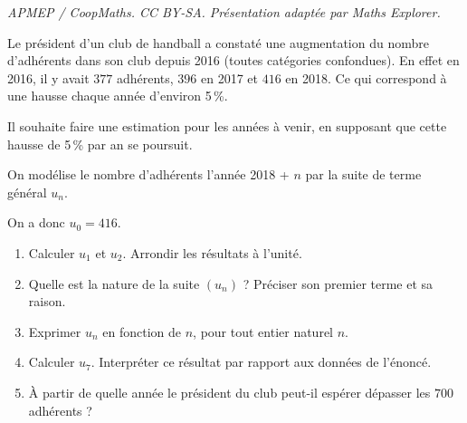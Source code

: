\documentclass[10pt]{article}
\begin{document}
\noindent\textit{APMEP / CoopMaths. CC BY-SA. Présentation adaptée par Maths Explorer.}\par\medskip
\medskip

Le président d'un club de handball a constaté une augmentation du nombre d'adhérents dans
son club depuis 2016 (toutes catégories confondues). En effet en 2016, il y avait $377$ adhérents,
$396$ en 2017 et $416$ en 2018. Ce qui correspond à une hausse chaque année d'environ 5\,\%.

Il souhaite faire une estimation pour les années à venir, en supposant que cette hausse de 5\,\%
par an se poursuit.

On modélise le nombre d'adhérents l'année 2018 + $n$ par la suite de terme général $u_n$.

On a donc $u_0 = 416$.

\medskip

\begin{enumerate}
\item Calculer $u_1$ et $u_2$. Arrondir les résultats à l'unité.
\item Quelle est la nature de la suite $\left(u_n\right)$ ? Préciser son premier terme et sa raison.
\item Exprimer $u_n$ en fonction de $n$, pour tout entier naturel $n$.
\item Calculer $u_7$. Interpréter ce résultat par rapport aux données de l'énoncé.
\item À partir de quelle année le président du club peut-il espérer dépasser les $700$ adhérents ?
\end{enumerate}

\vspace{0,5cm}
\end{document}
